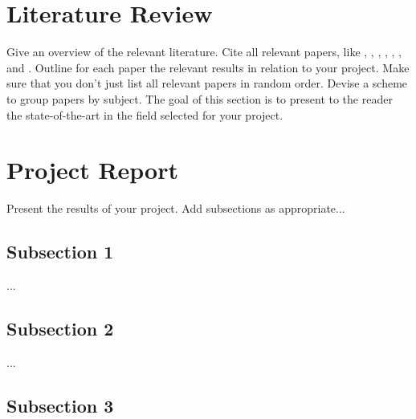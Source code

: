 \documentclass[11pt]{article}       %
\begin{document}
\section{Literature Review} \label{litrev}

Give an overview of the relevant literature. Cite all relevant
papers, like \cite{DEL07}, \cite{PD07}, \cite{DER07}, \cite{LDR07},
\cite{DLX06}, \cite{CDE06}, and \cite{DFL06}. Outline for each paper
the relevant results in relation to your project. Make sure that you
don't just list all relevant papers in random order. Devise a scheme
to group papers by subject. The goal of this section is to present
to the reader the state-of-the-art in the field selected for your
project.

\section{Project Report} \label{projrep}

Present the results of your project. Add subsections as appropriate...

\subsection{Subsection 1} \label{subsect1}

...

\subsection{Subsection 2} \label{subsect2}

...

\subsection{Subsection 3} \label{subsect3}
\end{document}
